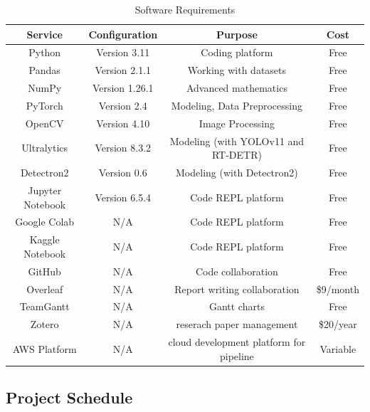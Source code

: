 \documentclass[stu,12pt,floatsintext]{apa7}
\begin{document}
\begin{table}[!htb]
	\centering
	\caption{Software Requirements}
	\begin{tabular}{cccc}
		\hline
		Service          & Configuration  & Purpose                      & Cost      \\
		\hline
		Python           & Version 3.11   & Coding platform              & Free      \\
		Pandas           & Version 2.1.1  & Working with datasets        & Free      \\
		NumPy            & Version 1.26.1 & Advanced mathematics         & Free      \\
		PyTorch          & Version 2.4    & Modeling, Data Preprocessing & Free      \\
		OpenCV           & Version 4.10   & Image Processing             & Free      \\
		Ultralytics      & Version 8.3.2  & Modeling (with YOLOv11 and RT-DETR)       & Free      \\
		Detectron2       & Version 0.6    & Modeling (with Detectron2)   & Free      \\
		Jupyter Notebook & Version 6.5.4  & Code REPL platform           & Free      \\
		Google Colab     & N/A            & Code REPL platform           & Free      \\
		Kaggle Notebook  & N/A            & Code REPL platform           & Free      \\
		GitHub           & N/A            & Code collaboration           & Free      \\
		Overleaf         & N/A            & Report writing collaboration & \$9/month \\
		TeamGantt        & N/A            & Gantt charts                 & Free      \\
        Zotero           & N/A            & reserach paper management    & \$20/year \\
        AWS Platform     & N/A            & cloud development platform for pipeline& Variable \\ 
		\hline
	\end{tabular}
	\label{tab:software}
\end{table}

\subsection{Project Schedule}
\end{document}
